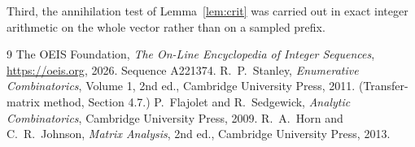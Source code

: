 \documentclass[11pt,a4paper]{article}
\theoremstyle{plain}
\theoremstyle{definition}
\begin{document}
Third, the annihilation test of Lemma~\ref{lem:crit} was carried out in exact integer
arithmetic on the whole vector rather than on a sampled prefix.

\begin{thebibliography}{9}
 The OEIS Foundation, \emph{The On-Line Encyclopedia of Integer
Sequences}, \url{https://oeis.org}, 2026. Sequence A221374.
 R.~P.~Stanley, \emph{Enumerative Combinatorics}, Volume 1, 2nd ed.,
Cambridge University Press, 2011. (Transfer-matrix method, Section 4.7.)
 P.~Flajolet and R.~Sedgewick, \emph{Analytic Combinatorics}, Cambridge
University Press, 2009.
 R.~A.~Horn and C.~R.~Johnson, \emph{Matrix Analysis}, 2nd ed., Cambridge
University Press, 2013.
\end{thebibliography}
\end{document}
